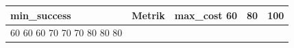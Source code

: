 \begin{tabular}{llccc}
\hline
min\_success & Metrik & max\_cost 60 & 80 & 100 \\ 
\hline
60%
60%
60%
70%
70%
70%
80%
80%
80%
\hline
\end{tabular}
